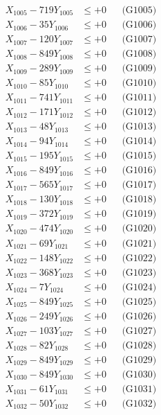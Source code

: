 \documentclass[a4paper,10pt]{article}
\begin{document}
{\begin{align}
X_{1005} - 719Y_{1005} &\leq +0 && \text{(G1005)} \\
X_{1006} - 35Y_{1006} &\leq +0 && \text{(G1006)} \\
X_{1007} - 120Y_{1007} &\leq +0 && \text{(G1007)} \\
X_{1008} - 849Y_{1008} &\leq +0 && \text{(G1008)} \\
X_{1009} - 289Y_{1009} &\leq +0 && \text{(G1009)} \\
X_{1010} - 85Y_{1010} &\leq +0 && \text{(G1010)} \\
\allowbreak
X_{1011} - 741Y_{1011} &\leq +0 && \text{(G1011)} \\
X_{1012} - 171Y_{1012} &\leq +0 && \text{(G1012)} \\
X_{1013} - 48Y_{1013} &\leq +0 && \text{(G1013)} \\
X_{1014} - 94Y_{1014} &\leq +0 && \text{(G1014)} \\
X_{1015} - 195Y_{1015} &\leq +0 && \text{(G1015)} \\
X_{1016} - 849Y_{1016} &\leq +0 && \text{(G1016)} \\
X_{1017} - 565Y_{1017} &\leq +0 && \text{(G1017)} \\
X_{1018} - 130Y_{1018} &\leq +0 && \text{(G1018)} \\
X_{1019} - 372Y_{1019} &\leq +0 && \text{(G1019)} \\
X_{1020} - 474Y_{1020} &\leq +0 && \text{(G1020)} \\
\allowbreak
X_{1021} - 69Y_{1021} &\leq +0 && \text{(G1021)} \\
X_{1022} - 148Y_{1022} &\leq +0 && \text{(G1022)} \\
X_{1023} - 368Y_{1023} &\leq +0 && \text{(G1023)} \\
X_{1024} - 7Y_{1024} &\leq +0 && \text{(G1024)} \\
X_{1025} - 849Y_{1025} &\leq +0 && \text{(G1025)} \\
X_{1026} - 249Y_{1026} &\leq +0 && \text{(G1026)} \\
X_{1027} - 103Y_{1027} &\leq +0 && \text{(G1027)} \\
X_{1028} - 82Y_{1028} &\leq +0 && \text{(G1028)} \\
X_{1029} - 849Y_{1029} &\leq +0 && \text{(G1029)} \\
X_{1030} - 849Y_{1030} &\leq +0 && \text{(G1030)} \\
\allowbreak
X_{1031} - 61Y_{1031} &\leq +0 && \text{(G1031)} \\
X_{1032} - 50Y_{1032} &\leq +0 && \text{(G1032)} \\

\end{align}}
\end{document}

